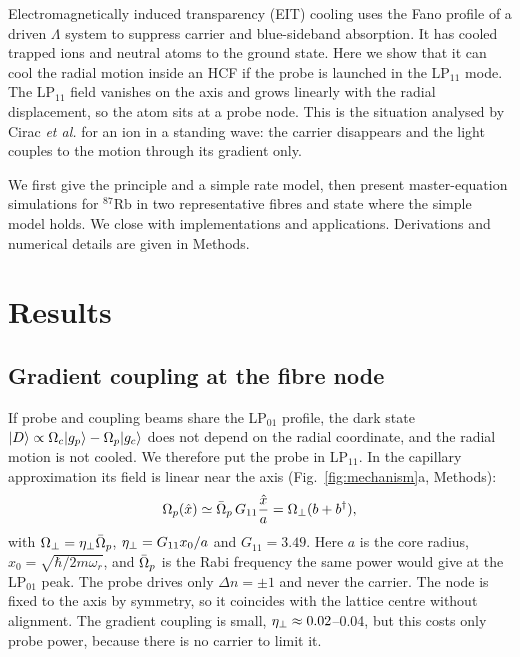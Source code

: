 \documentclass[10pt,twocolumn,a4paper]{article}
\begin{document}
Electromagnetically induced transparency (EIT) cooling uses the Fano profile of a driven $\Lambda$ system to suppress carrier and blue-sideband absorption\cite{morigi2000}. It has cooled trapped ions\cite{roos2000} and neutral atoms\cite{haller2015} to the ground state. Here we show that it can cool the radial motion inside an HCF if the probe is launched in the LP$_{11}$ mode. The LP$_{11}$ field vanishes on the axis and grows linearly with the radial displacement, so the atom sits at a probe node. This is the situation analysed by Cirac \emph{et al.} for an ion in a standing wave\cite{cirac1992}: the carrier disappears and the light couples to the motion through its gradient only.

We first give the principle and a simple rate model, then present master-equation simulations for $^{87}$Rb in two representative fibres and state where the simple model holds. We close with implementations and applications. Derivations and numerical details are given in Methods.

\section{Results}
\subsection{Gradient coupling at the fibre node}
If probe and coupling beams share the LP$_{01}$ profile, the dark state $|D\rangle\propto\Omega_c|g_p\rangle-\Omega_p|g_c\rangle$ does not depend on the radial coordinate, and the radial motion is not cooled. We therefore put the probe in LP$_{11}$. In the capillary approximation\cite{marcatili1964,snyder1983} its field is linear near the axis (Fig.~\ref{fig:mechanism}a, Methods):
\begin{equation}
  \Omega_p(\hat x)\simeq\bar{\Omega}_p\,G_{11}\frac{\hat x}{a}=\Omega_\perp(b+b^\dagger),
  \label{eq:etap}
\end{equation}
with $\Omega_\perp=\eta_{\perp}\bar{\Omega}_p$, $\eta_{\perp}=G_{11}x_0/a$ and $G_{11}=3.49$. Here $a$ is the core radius, $x_0=\sqrt{\hbar/2m\omega_r}$, and $\bar{\Omega}_p$ is the Rabi frequency the same power would give at the LP$_{01}$ peak. The probe drives only $\Delta n=\pm1$ and never the carrier. The node is fixed to the axis by symmetry, so it coincides with the lattice centre without alignment. The gradient coupling is small, $\eta_{\perp}\approx0.02$--0.04, but this costs only probe power, because there is no carrier to limit it.
\end{document}
